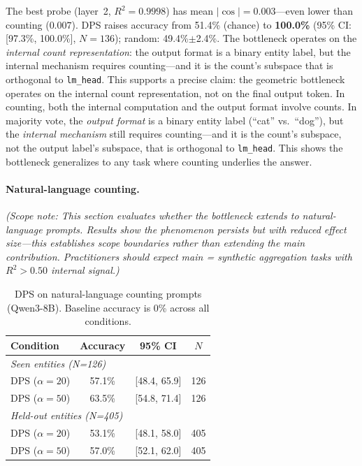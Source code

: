 \documentclass{article}
\begin{document}
The best probe (layer~2, $R^2 = 0.9998$) has mean $|\cos| = 0.003$---even lower than counting ($0.007$).
DPS raises accuracy from 51.4\% (chance) to \textbf{100.0\%} (95\% CI: [97.3\%, 100.0\%], $N{=}136$); random: 49.4\%$\pm$2.4\%.
The bottleneck operates on the \emph{internal count representation}: the output format is a binary entity label, but the internal mechanism requires counting---and it is the count's subspace that is orthogonal to \texttt{lm\_head}.
This supports a precise claim: the geometric bottleneck operates on the
internal count representation, not on the final output token.
In counting, both the internal computation and the output format involve counts.
In majority vote, the \emph{output format} is a binary entity label (``cat'' vs.\ ``dog''),
but the \emph{internal mechanism} still requires counting---and it is the count's
subspace, not the output label's subspace, that is orthogonal to \texttt{lm\_head}.
This shows the bottleneck generalizes to any task where counting underlies the answer.

\paragraph{Natural-language counting.}

\emph{(Scope note: This section evaluates whether the bottleneck extends to natural-language prompts. Results show the phenomenon persists but with reduced effect size---this establishes scope boundaries rather than extending the main contribution. Practitioners should expect main = synthetic aggregation tasks with $R^2 > 0.50$ internal signal.)}

\begin{table}[h]
\centering
\caption{DPS on natural-language counting prompts (Qwen3-8B).
Baseline accuracy is 0\% across all conditions.}
\label{tab:dps_natural}
\begin{tabular}{lccc}
\toprule
Condition & Accuracy & 95\% CI & $N$ \\
\midrule
\multicolumn{4}{l}{\emph{Seen entities (N=126)}} \\
DPS ($\alpha=20$) & 57.1\% & [48.4, 65.9] & 126 \\
DPS ($\alpha=50$) & 63.5\% & [54.8, 71.4] & 126 \\
\multicolumn{4}{l}{\emph{Held-out entities (N=405)}} \\
DPS ($\alpha=20$) & 53.1\% & [48.1, 58.0] & 405 \\
DPS ($\alpha=50$) & 57.0\% & [52.1, 62.0] & 405 \\
\bottomrule
\end{tabular}
\end{table}
\end{document}

